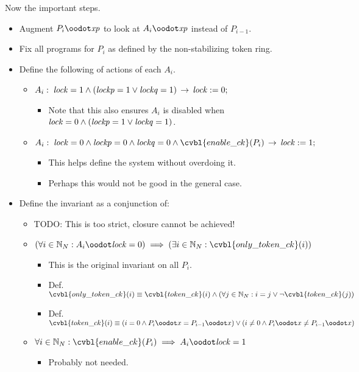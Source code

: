 Now the important steps.
\begin{itemize}
\item Augment $P_i\oodot\vbl{xp}$ to look at $A_i\oodot\vbl{xp}$ instead of $P_{i-1}$.
\item Fix all programs for $P_i$ as defined by the non-stabilizing token ring.
\item Define the following of actions of each $A_i$.
 \begin{itemize}
 \item $A_i:\; \mathit{lock}=1 \wedge (\mathit{lockp}=1 \vee \mathit{lockq}=1) \,\to\, \mathit{lock}:= 0;$
  \begin{itemize}
  \item Note that this also ensures $A_i$ is disabled when $\mathit{lock}=0 \wedge (\mathit{lockp}=1 \vee \mathit{lockq}=1)$.
  \end{itemize}
 \item $A_i:\; \vbl{lock}=0 \wedge \vbl{lockp}=0 \wedge \vbl{lockq}=0 \wedge \cvbl{enable\_ck}(P_i) \actxnto \vbl{lock}\defeq 1;$
  \begin{itemize}
  \item This helps define the system without overdoing it.
  \item Perhaps this would not be good in the general case.
  \end{itemize}
 \end{itemize}
\item Define the invariant as a conjunction of:
 \begin{itemize}
 \item TODO: This is too strict, closure cannot be achieved!
 \item $(\forall i\in\Nat_N: A_i\oodot\vbl{lock}=0) \implies (\exists i\in \Nat_N: \cvbl{only\_token\_ck}(i))$
  \begin{itemize}
  \item This is the original invariant on all $P_i$.
  \item Def. $\cvbl{only\_token\_ck}(i)\equiv \cvbl{token\_ck}(i) \wedge (\forall j\in\Nat_N: i=j \vee \neg \cvbl{token\_ck}(j))$
  \item Def. $\cvbl{token\_ck}(i)\equiv (i=0\wedge P_i\oodot x = P_{i-1}\oodot x) \vee (i\ne 0\wedge P_i\oodot x \ne P_{i-1}\oodot x)$
  \end{itemize}
 \item $\forall i\in\Nat_N: \cvbl{enable\_ck}(P_i) \implies A_i\oodot\vbl{lock}=1$
  \begin{itemize}
  \item Probably not needed.

\end{itemize}
\end{itemize}
\end{itemize}

